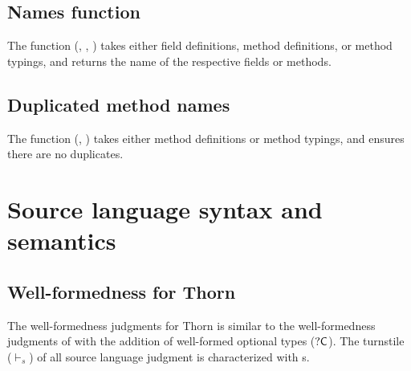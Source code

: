 \documentclass[acmlarge, anonymous, authordraft, review]{acmart} %
\begin{document}
\begin{mathpar}

\end{mathpar}

\subsection{Names function}

The  function (, , ) takes either field definitions, method definitions, or 
method typings, and returns the name of the respective fields or methods.

\subsection{Duplicated method names}

The  function (, ) takes either
method definitions or method typings, and ensures there are no duplicates.

\clearpage

\section{Source language syntax and semantics}


\subsection*{Well-formedness for Thorn}

The well-formedness judgments for Thorn is similar to the well-formedness judgments of \kafka with the addition
of well-formed optional types ($\CW$). The turnstile ($\vdash_{\!s}$) of all source language judgment is characterized with s.
\end{document}
